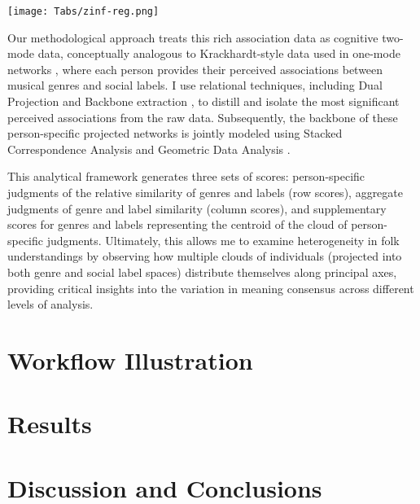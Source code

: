 \documentclass[12pt]{article}
\begin{document}
\begin{table}
    \caption{.}
    \centering
    \texttt{[image: Tabs/zinf-reg.png]}
    \label{tab:zinf}
\end{table}

Our methodological approach treats this rich association data as cognitive two-mode data, conceptually analogous to Krackhardt-style data used in one-mode networks \citep{batchelder1997consensus-f5c, kumbasar1994systematic-213}, where each person provides their perceived associations between musical genres and social labels. I use relational techniques, including Dual Projection and Backbone extraction \citep{everett2013dual-projection-c89, neal2014backbone-b29}, to distill and isolate the most significant perceived associations from the raw data. Subsequently, the backbone of these person-specific projected networks is jointly modeled using Stacked Correspondence Analysis and Geometric Data Analysis \citep{roux2004geometric-65c}. 

This analytical framework generates three sets of scores: person-specific judgments of the relative similarity of genres and labels (row scores), aggregate judgments of genre and label similarity (column scores), and supplementary scores for genres and labels representing the centroid of the cloud of person-specific judgments. Ultimately, this allows me to examine heterogeneity in folk understandings by observing how multiple clouds of individuals (projected into both genre and social label spaces) distribute themselves along principal axes, providing critical insights into the variation in meaning consensus across different levels of analysis.

\section*{Workflow Illustration}

\section*{Results}

\section*{Discussion and Conclusions}

\newpage


\end{document}
